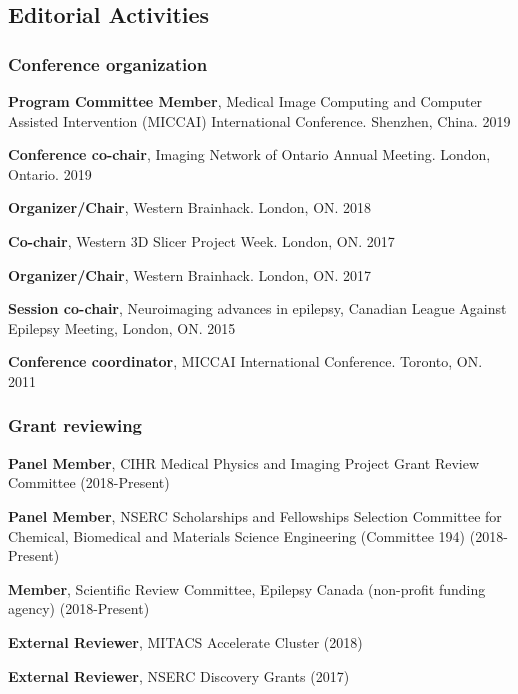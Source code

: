 \newenvironment{packed_enum}{
\begin{enumerate}
  \setlength{\itemsep}{1pt}
  \setlength{\parskip}{0pt}
  \setlength{\parsep}{0pt}
}{\end{enumerate}}

\newenvironment{packed_item}{
\begin{itemize}
  \setlength{\itemsep}{1pt}
  \setlength{\parskip}{0pt}
  \setlength{\parsep}{0pt}
}{\end{itemize}}

\subsection{Editorial Activities}

\subsubsection*{Conference organization}

\begin{packed_enum}
\item \textbf{ Program Committee Member}, Medical Image Computing and Computer Assisted Intervention (MICCAI) International Conference. Shenzhen, China. 2019
\item \textbf{ Conference co-chair}, Imaging Network of Ontario Annual Meeting. London, Ontario. 2019
\item \textbf{ Organizer/Chair}, Western Brainhack. London, ON. 2018
\item \textbf{ Co-chair}, Western 3D Slicer Project Week. London, ON. 2017
\item \textbf{ Organizer/Chair}, Western Brainhack. London, ON. 2017
\item \textbf{ Session co-chair}, Neuroimaging advances in epilepsy, Canadian League Against Epilepsy Meeting, London, ON. 2015
\item \textbf{ Conference coordinator}, MICCAI International Conference. Toronto, ON. 2011
\end{packed_enum}

\subsubsection*{Grant reviewing}

\begin{packed_item}
\item \textbf{Panel Member}, CIHR Medical Physics and Imaging Project Grant Review Committee (2018-Present)
\item \textbf{Panel Member}, NSERC Scholarships and Fellowships Selection Committee for Chemical, Biomedical and Materials Science Engineering (Committee 194) (2018-Present)
\item \textbf{Member}, Scientific Review Committee, Epilepsy Canada (non-profit funding agency) (2018-Present)
\item \textbf{External Reviewer}, MITACS Accelerate Cluster (2018)
\item \textbf{External Reviewer}, NSERC Discovery Grants (2017)
\end{packed_item}

